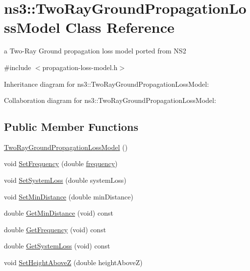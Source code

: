 \hypertarget{classns3_1_1TwoRayGroundPropagationLossModel}{}\section{ns3\+:\+:Two\+Ray\+Ground\+Propagation\+Loss\+Model Class Reference}
\label{classns3_1_1TwoRayGroundPropagationLossModel}


a Two-\/\+Ray Ground propagation loss model ported from N\+S2  




{\ttfamily \#include $<$propagation-\/loss-\/model.\+h$>$}



Inheritance diagram for ns3\+:\+:Two\+Ray\+Ground\+Propagation\+Loss\+Model\+:


Collaboration diagram for ns3\+:\+:Two\+Ray\+Ground\+Propagation\+Loss\+Model\+:
\subsection*{Public Member Functions}
\begin{DoxyCompactItemize}
\item 
\hyperlink{classns3_1_1TwoRayGroundPropagationLossModel_a3f81edd7dca7de8a299d61c6582989bb}{Two\+Ray\+Ground\+Propagation\+Loss\+Model} ()
\item 
void \hyperlink{classns3_1_1TwoRayGroundPropagationLossModel_a9117993a967cfc85ba639030961b6528}{Set\+Frequency} (double \hyperlink{mmwave_2model_2fading-traces_2fading__trace__generator_8m_a09045328d6d7e16aa4013f526cc6993d}{frequency})
\item 
void \hyperlink{classns3_1_1TwoRayGroundPropagationLossModel_a79dbc7f262cc7486ab03574759b3a2d1}{Set\+System\+Loss} (double system\+Loss)
\item 
void \hyperlink{classns3_1_1TwoRayGroundPropagationLossModel_a7b35af004bb79436372172f779753e5f}{Set\+Min\+Distance} (double min\+Distance)
\item 
double \hyperlink{classns3_1_1TwoRayGroundPropagationLossModel_aca9770656137034f53f8e750c6fb58bc}{Get\+Min\+Distance} (void) const 
\item 
double \hyperlink{classns3_1_1TwoRayGroundPropagationLossModel_aa901d678daedea6436f053ebbe8dee2f}{Get\+Frequency} (void) const 
\item 
double \hyperlink{classns3_1_1TwoRayGroundPropagationLossModel_a4b402cc2518313fe5b7486bd0d6e9a06}{Get\+System\+Loss} (void) const 
\item 
void \hyperlink{classns3_1_1TwoRayGroundPropagationLossModel_af3d273a524b3d7cbb8ec3691fcb01982}{Set\+Height\+AboveZ} (double height\+AboveZ)
\end{DoxyCompactItemize}

